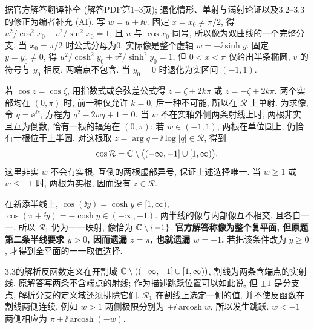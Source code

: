 \begin{solution}
据官方解答翻译补全 (解答PDF第1--3页); 退化情形、单射与满射论证以及3.2--3.3的修正为编者补充 (AI). 写 $w=u+\ii v$. 固定 $x=x_0\ne\pi/2$, 得 $u^2/\cos^2x_0-v^2/\sin^2x_0=1$, 且 $u$ 与 $\cos x_0$ 同号, 所以像为双曲线的一个完整分支. 当 $x_0=\pi/2$ 时公式分母为0, 实际像是整个虚轴 $w=-\ii\sinh y$. 固定 $y=y_0\ne0$, 得 $u^2/\cosh^2y_0+v^2/\sinh^2y_0=1$, 但 $0<x<\pi$ 仅给出半条椭圆, $v$ 的符号与 $y_0$ 相反, 两端点不包含. 当 $y_0=0$ 时退化为实区间 $(-1,1)$.

若 $\cos z=\cos\zeta$, 用指数式或余弦差公式得 $z=\zeta+2k\pi$ 或 $z=-\zeta+2k\pi$. 两个实部均在 $(0,\pi)$ 时, 前一种仅允许 $k=0$, 后一种不可能, 所以在 $\mathcal R$ 上单射. 为求像, 令 $q=\ee^{\ii z}$, 方程为 $q^2-2wq+1=0$. 当 $w$ 不在实轴外侧两条射线上时, 两根非实且互为倒数, 恰有一根的辐角在 $(0,\pi)$; 若 $w\in(-1,1)$, 两根在单位圆上, 仍恰有一根位于上半圆. 对这根取 $z=\arg q-\ii\log|q|\in\mathcal R$, 得到
\[
\cos\mathcal R=\mathbb C\setminus\bigl(( -\infty,-1]\cup[1,\infty)\bigr).
\]
这里非实 $w$ 不会有实根, 互倒的两根虚部异号, 保证上述选择唯一. 当 $w\ge1$ 或 $w\le-1$ 时, 两根为实根, 因而没有 $z\in\mathcal R$.

在新添半线上, $\cos(\ii y)=\cosh y\in[1,\infty)$, $\cos(\pi+\ii y)=-\cosh y\in(-\infty,-1)$. 两半线的像与内部像互不相交, 且各自一一, 所以 $\mathcal R_1$ 仍为一一映射, 像恰为 $\mathbb C\setminus\{-1\}$. \textbf{官方解答称像为整个复平面, 但原题第二条半线要求 $y>0$, 因而遗漏 $z=\pi$, 也就遗漏 $w=-1$.} 若把该条件改为 $y\ge0$, 才得到全平面的一一取值选择.

3.3的解析反函数定义在开割域 $\mathbb C\setminus(( -\infty,-1]\cup[1,\infty))$, 割线为两条含端点的实射线. 原解答写两条不含端点的射线; 作为描述跳跃位置可以如此说, 但 $\pm1$ 是分支点, 解析分支的定义域还须排除它们. $\mathcal R_1$ 在割线上选定一侧的值, 并不使反函数在割线两侧连续. 例如 $w>1$ 两侧极限分别为 $\pm\ii\operatorname{arcosh}w$, 所以发生跳跃. $w<-1$ 两侧相应为 $\pi\pm\ii\operatorname{arcosh}(-w)$.

\end{solution}
